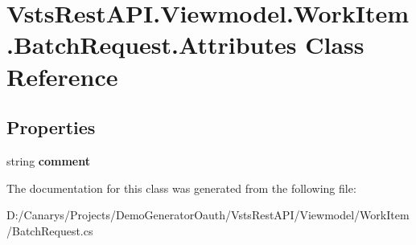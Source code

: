\hypertarget{class_vsts_rest_a_p_i_1_1_viewmodel_1_1_work_item_1_1_batch_request_1_1_attributes}{}\section{Vsts\+Rest\+A\+P\+I.\+Viewmodel.\+Work\+Item.\+Batch\+Request.\+Attributes Class Reference}
\label{class_vsts_rest_a_p_i_1_1_viewmodel_1_1_work_item_1_1_batch_request_1_1_attributes}
\subsection*{Properties}
\begin{DoxyCompactItemize}
\item 
\mbox{\label{class_vsts_rest_a_p_i_1_1_viewmodel_1_1_work_item_1_1_batch_request_1_1_attributes_af90ffdd2adac5647655e4ab4e1131ea7}} 
string {\bfseries comment}
\end{DoxyCompactItemize}


The documentation for this class was generated from the following file\+:\begin{DoxyCompactItemize}
\item 
D\+:/\+Canarys/\+Projects/\+Demo\+Generator\+Oauth/\+Vsts\+Rest\+A\+P\+I/\+Viewmodel/\+Work\+Item/Batch\+Request.\+cs\end{DoxyCompactItemize}
